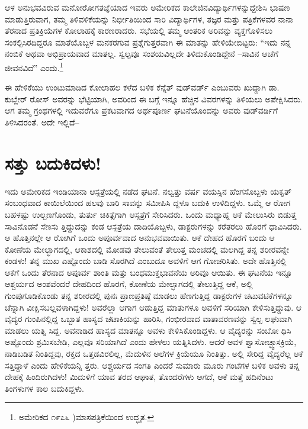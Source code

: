 \vskip 2pt

ಆಳ ಅನುಭವವಿರುವ ಮನೋರೋಗತಜ್ಞೆಯಾದ ಇವರು ಅಮೇರಿಕದ ಕಾಲೇಜಿನ\break ವಿದ್ಯಾರ್ಥಿಗಳನ್ನುದ್ದೇಶಿಸಿ ಭಾಷಣ ಮಾಡುತ್ತಿರುವಾಗ, ತಮ್ಮ ತಿಳಿವಳಿಕೆಯನ್ನು ನಿರ್ಭೀತಿಯಿಂದ ಸಾರಿ ವಿದ್ಯಾರ್ಥಿಗಳ, ತಜ್ಞರ ಮತ್ತು ಪತ್ರಿಕೆಗಳವರ ನಾನಾ ತೆರನಾದ ಪ್ರತಿಕ್ರಿಯೆಗಳ ಕೋಲಾಹಕ್ಕೆ ಕಾರಣರಾದರು. ಸಭೆಯಲ್ಲಿ ತಮ್ಮ ಆಂತರಿಕ ಅರಿವನ್ನು ವ್ಯಕ್ತಗೊಳಿಸಲು ಸಂಕಲ್ಪಿಸಿರದಿದ್ದರೂ ಮಾತೆಯೊಬ್ಬಳ ಮನಕರಗುವ ಪ್ರಶ್ನೆಗುತ್ತರವಾಗಿ ಈ ಮಾತನ್ನು ಹೇಳಿಯೇಬಿಟ್ಟರು: “ಇದು ನನ್ನ ನಂಬಿಕೆ ಅಥವಾ ಅಭಿಪ್ರಾಯವಾದ ಮಾತಲ್ಲ. ಸ್ವಲ್ಪವೂ ಸಂಶಯವಿಲ್ಲದೇ ತಿಳಿದುಕೊಂಡಿದ್ದೇನೆ –ಸಾವಿನ ಆಚೆಗೆ ಜೀವನವಿದೆ” ಎಂದು.\footnote{ಅಮೇರಿಕದ ೧೯೭೬ )ಮಾಸಪತ್ರಿಕೆಯಿಂದ ಉದ್ಧೃತ.}

\vskip 2pt

ಈ ಹೇಳಿಕೆಯು ಉಂಟುಮಾಡಿದ ಕೋಲಾಹಲ ಕಳೆದ ಬಳಿಕ ಕೆನ್ನೆತ್ ವುಡ್​ವರ್ಡ್ ಎಂಬುವರು ಖುದ್ದಾಗಿ ಡಾ. ಕುಬ್ಲೇರ್ ರೋಸ್ ಅವರನ್ನು ಭೆಟ್ಟಿಯಾಗಿ, ಅವರಿಂದ ಈ ಬಗ್ಗೆ ಇನ್ನೂ ಹೆಚ್ಚಿನ ವಿವರಗಳನ್ನು ತಿಳಿಯಲು ಅಪೇಕ್ಷಿಸಿದರು. ಆಗ ತಮ್ಮ ಗ್ರಂಥಗಳಲ್ಲಿ ಇದುವರೆಗೂ ಪ್ರಕಟವಾಗದ ಅರ್ಥಪೂರ್ಣ ಘಟನೆಯೊಂದನ್ನು ಅವರು ವುಡ್​ವರ್ಡಿಗೆ ತಿಳಿಸಿದರಂತೆ. ಅದೇ ಇಲ್ಲಿದೆ–


\section*{ಸತ್ತು ಬದುಕಿದಳು!}


ಇದು ಅಮೇರಿಕದ ಇಂಡಿಯಾನಾ ಆಸ್ಪತ್ರೆಯಲ್ಲಿ ನಡೆದ ಘಟನೆ. ನಲ್ವತ್ತು ವರ್ಷ ವಯಸ್ಸಿನ ಹೆಂಗಸೊಬ್ಬಳು ಯಕೃತ್ ಸಂಬಂಧವಾದ ಕಾಯಿಲೆಯಿಂದ ಹಲವು ಬಾರಿ ಸಾವನ್ನು ಸಮೀಪಿಸಿ ದ್ದಳೂ ಬದುಕಿ ಉಳಿದಿದ್ದಳು. ಒಮ್ಮೆ ಆ ರೋಗ ಬಹಳಷ್ಟು ಉಲ್ಬಣಗೊಂಡು, ತುರ್ತು ಚಿಕಿತ್ಸೆಗಾಗಿ ಆಸ್ಪತ್ರೆಗೆ ಸೇರಿಸಿದರು. ಒಂದು ಮಧ್ಯಾಹ್ನ ಆಕೆ ಮೇಲುಸಿರು ಬಿಡುತ್ತ ಸಾವಿನೊಡನೆ ಸೆಣಸು ತ್ತಿದ್ದುದನ್ನು ಕಂಡ ಆಸ್ಪತ್ರೆಯ ದಾದಿಯೊಬ್ಬಳು, ಡಾಕ್ಟರುಗಳನ್ನು ಕರೆತರಲು ಹೊರಗೆ ಧಾವಿಸಿದರು. ಆ ಹೊತ್ತಿನಲ್ಲೇ ಆ ರೋಗಿಗೆ ಒಂದು ಅಪೂರ್ವವಾದ ಅನುಭವವಾಯಿತು. ಆಕೆ ದೇಹದ ಹೊರಗೆ ಬಂದು ಆ ಕೋಣೆಯ ಮೇಲ್ಭಾಗದಲ್ಲಿ, ಆಕಾಶದಲ್ಲಿ ಮೋಡವು ತೇಲುವಂತೆ ತೇಲುತ್ತ ಮಂಚದಲ್ಲಿ ಮಲಗಿದ್ದ ತನ್ನ ಶರೀರವನ್ನೇ ಕಂಡಳು! ತನ್ನ ಮುಖ ಎಷ್ಟೊಂದು ಬಾಡಿ ಸೊರಗಿದೆ ಎಂಬುದೂ ಅವಳಿಗೆ ಆಗ ಗೋಚರಿಸಿತು. ಅದೇ ಹೊತ್ತಿನಲ್ಲಿ ಆಕೆಗೆ ಒಂದು ತೆರನಾದ ಅಪೂರ್ವ ಶಾಂತಿ ಮತ್ತು ಬಂಧಮುಕ್ತಭಾವನೆಯ ಅರಿವೂ ಆಯಿತು. ಈ ಘಟನೆಯ ಇನ್ನೂ ಆಶ್ಚರ್ಯದ ಅಂಶವೆಂದರೆ ದೇಹದಿಂದ ಹೊರಗೆ, ಕೋಣೆಯ ಮೇಲ್ಭಾಗದಲ್ಲಿ ತೇಲುತ್ತಿದ್ದ ಆಕೆ, ಅಲ್ಲಿ ಗುಂಪುಗೂಡಿಕೊಂಡು ತನ್ನ ಶರೀರದಲ್ಲಿ ಪುನಃ ಪ್ರಾಣಪ್ರತಿಷ್ಠೆ ಮಾಡಲು ಹೆಣಗುತ್ತಿದ್ದ ಡಾಕ್ಟರುಗಳ ಚಟುವಟಿಕೆಗಳನ್ನೂ ಚೆನ್ನಾಗಿ ವೀಕ್ಷಿಸಬಲ್ಲವಳಾಗಿದ್ದಳು! ಅವರೆಲ್ಲಾ ಆಗಾಗ ಆಡುತ್ತಿದ್ದ ಮಾತುಗಳೂ ಅವಳಿಗೆ ಸರಿಯಾಗಿ ಕೇಳಿಸುತ್ತಿದ್ದುವು. ಆ ವೈದ್ಯರ ಗುಂಪಿನಲ್ಲಿದ್ದ ಒಬ್ಬಾತ ಹಾಸ್ಯದ ಚಟಾಕಿಯನ್ನು ಹಾರಿಸಿ, ಗಂಭೀರವಾದ ವಾತಾವರಣವನ್ನು ಸ್ವಲ್ಪ ಲಘುವಾಗಿ ಮಾಡಲು ಯತ್ನಿ ಸಿದ್ದ. ಅವನಾಡಿದ ಹಾಸ್ಯದ ಮಾತನ್ನೂ ಅವಳು ಕೇಳಿಸಿಕೊಂಡಿದ್ದಳು. ಆ ವೈದ್ಯರನ್ನು ಸಂಬೋ ಧಿಸಿ ಅಷ್ಟೊಂದು ಶ್ರಮಿಸಬೇಡಿ, ಎಲ್ಲವೂ ಸರಿಯಾಗಿದೆ ಎಂದು ಹೇಳಲು ಯತ್ನಿಸಿದಳು. ಆದರೆ ಅವಳ ಶ್ವಾಸೋಚ್ಛ್ವಾಸಕ್ರಿಯೆ, ನಾಡಿಬಡಿತ ನಿಂತಿದ್ದವು, ರಕ್ತದ ಒತ್ತಡವಿರಲಿಲ್ಲ, ಮೆದುಳಿನ ಅಲೆಗಳ ಕ್ರಿಯೆಯೂ ನಿಂತಿತ್ತು. ಅಲ್ಲಿ ಸೇರಿದ್ದ ವೈದ್ಯರೆಲ್ಲ ಆಕೆ ಸತ್ತಿದ್ದಾಳೆ ಎಂದು ಹೇಳಿಕೆಯನ್ನಿ ತ್ತರು. ಆಶ್ಚರ್ಯದ ಸಂಗತಿ ಎಂದರೆ ಸುಮಾರು ಮೂರು ಗಂಟೆಗಳ ಬಳಿಕ ಅವಳು ತನ್ನ ದೇಹಕ್ಕೆ ಹಿಂದಿರುಗಿದಳು! ಮಿದುಳಿಗೆ ಯಾವ ತರದ ಆಘಾತ, ತೊಂದರೆಗಳು ಆಗದೆ, ಆಕೆ ಮತ್ತೆ ಹದಿನೆಂಟು ತಿಂಗಳುಗಳ ಕಾಲ ಬದುಕಿದ್ದಳು.

